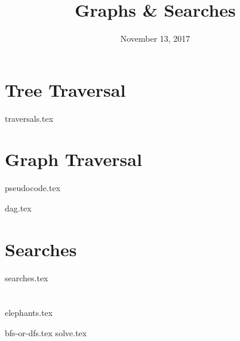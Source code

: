 \documentclass[11pt]{exam}
\title{Graphs \& Searches}
\date{November 13, 2017}
\begin{document}
\maketitle

\section{Tree Traversal}
\begin{questions}
{traversals.tex}
\end{questions}

\section{Graph Traversal}
{pseudocode.tex}
\begin{questions}
{dag.tex}
\end{questions}

\clearpage

\section{Searches}
\begin{questions}
{searches.tex}
\end{questions}

\section{}
{elephants.tex}
\begin{questions}
{bfs-or-dfs.tex}
{solve.tex}
\end{questions}
\end{document}

